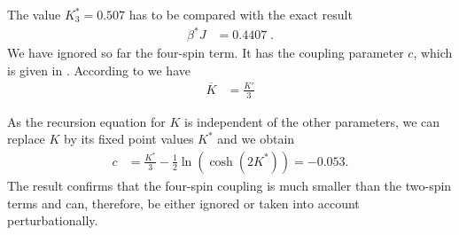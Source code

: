 The value $K^{*}_{3}=0.507$ has to be compared with the exact result
%
\begin{align*}
\beta^{*} J &= 0.4407\;.
\end{align*}
%
We have ignored so far the four-spin term. It has the coupling parameter $c$, which is given in 
. According to  we have
%
\begin{align*}
\overline K &= \frac{K'}{3}
\end{align*}

As the recursion equation for $K$ is independent of the other parameters, 
we can replace $K$ by its  fixed point values $K^{*}$ and we obtain
\begin{align}\label{eq:four:spin:term}
c &=  \frac{K^{*}}{3}  - \frac{1}{2}\ln(\cosh(2 K^{*})) = -0.053.
\end{align}
%
%
The result confirms that the four-spin coupling is much smaller than the two-spin terms
and can, therefore, be either ignored or taken into account perturbationally.








